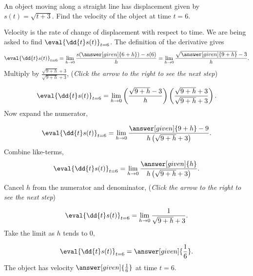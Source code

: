 \documentclass{ximera}
\begin{document}
\begin{example}
  An object moving along a straight line has displacement given by
  $s(t) = \sqrt{t+3}$.  Find the velocity of the object at time $t=6$.
  \begin{explanation}
    Velocity is the rate of change of displacement with respect to
    time.  We are being asked to find $\eval{\dd{t} s(t)}_{t=6}$.  The
    definition of the derivative gives
    \[
    \eval{\dd{t} s(t)}_{t=6} 
    = \lim_{h \to 0} \frac{s(\answer[given]{6+h})-s(6)}{h}
    = \lim_{h\to 0} \frac{\sqrt{\answer[given]{9+h}}-3}{h}.
    \]
    Multiply by $\frac{\sqrt{9+h}+3}{\sqrt{9+h}+3}$,
    {\color{blue}(\emph{Click the arrow to the right to see the next step})}
    \begin{expandable}
    \[
    \eval{\dd{t} s(t)}_{t=6} = \lim_{h\to 0} \left(\frac{\sqrt{9+h}-3}{h} \right)\left( \frac{\sqrt{9+h}+3}{\sqrt{9+h}+3} \right).
    \]		
    Now expand the numerator,
    \end{expandable}
    \[
    \eval{\dd{t} s(t)}_{t=6} = \lim_{h \to 0} \frac{\answer[given]{9+h} - 9}{h\left(\sqrt{9+h}+3 \right)}.
    \]
    Combine like-terms,
    \[
    \eval{\dd{t} s(t)}_{t=6} = \lim_{h \to 0} \frac{\answer[given]{h}}{h\left(\sqrt{9+h}+3\right)}.
    \]
    Cancel $h$ from the numerator and denominator, 
    {\color{blue}(\emph{Click the arrow to the right to see the next step})}
    \begin{expandable}
    \[
    \eval{\dd{t} s(t)}_{t=6} = \lim_{h\to 0} \frac{1}{\sqrt{9+h}+3}.
    \]
    Take the limit as $h$ tends to $0$,
    \end{expandable}
    \[
    \eval{\dd{t} s(t)}_{t=6} = \answer[given]{\frac{1}{6}}.
    \]
    The object has velocity $\answer[given]{\frac{1}{6}}$ at time $t=6$.
	\end{explanation}
\end{example}
\end{document}
